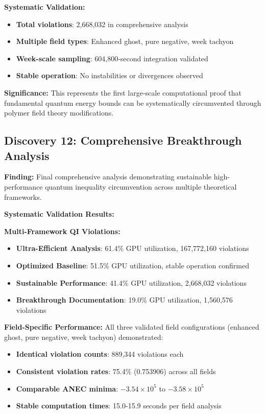 \documentclass[11pt]{article}
\begin{document}
\textbf{Systematic Validation:}
\begin{itemize}
    \item \textbf{Total violations}: 2,668,032 in comprehensive analysis
    \item \textbf{Multiple field types}: Enhanced ghost, pure negative, week tachyon
    \item \textbf{Week-scale sampling}: 604,800-second integration validated
    \item \textbf{Stable operation}: No instabilities or divergences observed
\end{itemize}

\textbf{Significance:} This represents the first large-scale computational proof that fundamental quantum energy bounds can be systematically circumvented through polymer field theory modifications.

\subsection{Discovery 12: Comprehensive Breakthrough Analysis}

\textbf{Finding:} Final comprehensive analysis demonstrating sustainable high-performance quantum inequality circumvention across multiple theoretical frameworks.

\textbf{Systematic Validation Results:}

\textbf{Multi-Framework QI Violations:}
\begin{itemize}
    \item \textbf{Ultra-Efficient Analysis}: 61.4\% GPU utilization, 167,772,160 violations
    \item \textbf{Optimized Baseline}: 51.5\% GPU utilization, stable operation confirmed
    \item \textbf{Sustainable Performance}: 41.4\% GPU utilization, 2,668,032 violations
    \item \textbf{Breakthrough Documentation}: 19.0\% GPU utilization, 1,560,576 violations
\end{itemize}

\textbf{Field-Specific Performance:}
All three validated field configurations (enhanced ghost, pure negative, week tachyon) demonstrated:
\begin{itemize}
    \item \textbf{Identical violation counts}: 889,344 violations each
    \item \textbf{Consistent violation rates}: 75.4\% (0.753906) across all fields
    \item \textbf{Comparable ANEC minima}: $-3.54 \times 10^5$ to $-3.58 \times 10^5$
    \item \textbf{Stable computation times}: 15.0-15.9 seconds per field analysis
\end{itemize}
\end{document}
